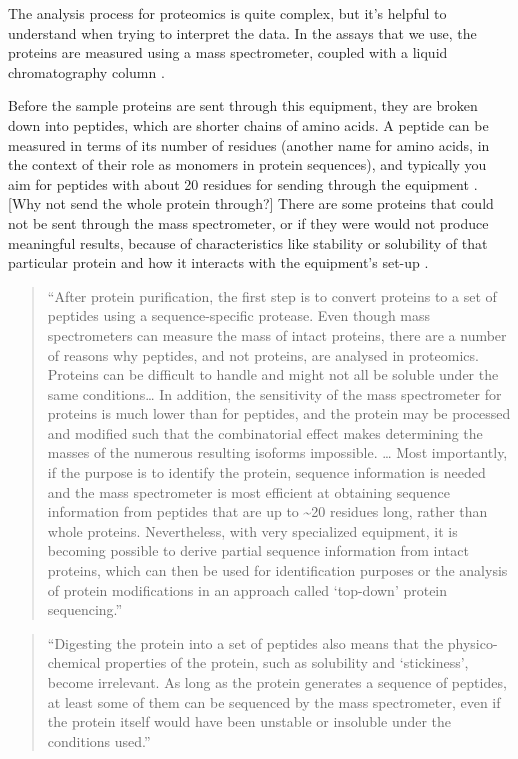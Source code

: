 \documentclass[
]{book}
\begin{document}
The analysis process for proteomics is quite complex, but it's helpful
to understand when trying to interpret the data. In the assays that we
use, the proteins are measured using a mass spectrometer, coupled with
a liquid chromatography column \citep{steen2004abc}.

Before the sample proteins are sent through this equipment, they are broken down
into peptides, which are shorter chains of amino acids. A peptide can be
measured in terms of its number of residues (another name for amino acids, in
the context of their role as monomers in protein sequences), and typically you
aim for peptides with about 20 residues for sending through the equipment
\citep{steen2004abc}. {[}Why not send the whole protein through?{]} There are some
proteins that could not be sent through the mass spectrometer, or if they were
would not produce meaningful results, because of characteristics like stability
or solubility of that particular protein and how it interacts with the
equipment's set-up \citep{steen2004abc}.

\begin{quote}
``After protein purification, the first step is to convert proteins to a set of
peptides using a sequence-specific protease. Even though mass spectrometers can
measure the mass of intact proteins, there are a number of reasons why peptides,
and not proteins, are analysed in proteomics. Proteins can be difficult to
handle and might not all be soluble under the same conditions\ldots{} In addition,
the sensitivity of the mass spectrometer for proteins is much lower than for
peptides, and the protein may be processed and modified such that the
combinatorial effect makes determining the masses of the numerous resulting
isoforms impossible. \ldots{} Most importantly, if the purpose is to identify the
protein, sequence information is needed and the mass spectrometer is most
efficient at obtaining sequence information from peptides that are up to \textasciitilde20
residues long, rather than whole proteins. Nevertheless, with very specialized
equipment, it is becoming possible to derive partial sequence information from
intact proteins, which can then be used for identification purposes or the
analysis of protein modifications in an approach called `top-down' protein
sequencing.'' \citep{steen2004abc}
\end{quote}

\begin{quote}
``Digesting the protein into a set of peptides also means that the
physico-chemical properties of the protein, such as solubility and `stickiness',
become irrelevant. As long as the protein generates a sequence of peptides, at
least some of them can be sequenced by the mass spectrometer, even if the
protein itself would have been unstable or insoluble under the conditions used.''
\citep{steen2004abc}
\end{quote}
\end{document}
